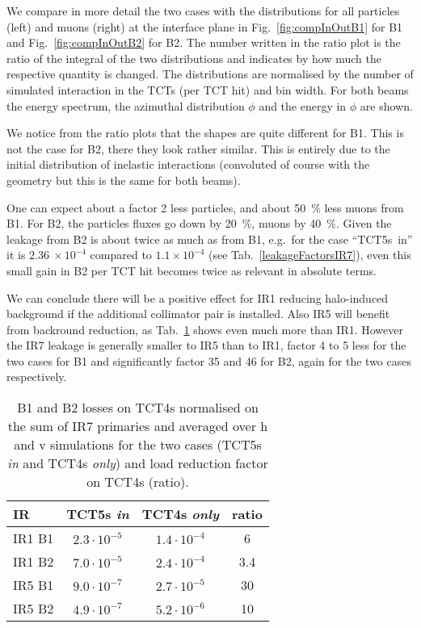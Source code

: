 We compare in more detail the two cases with the distributions for all particles (left) and muons (right) at the interface plane in Fig.~\ref{fig:compInOutB1} for B1 and Fig.~\ref{fig:compInOutB2} for B2. The number written in the ratio plot is the ratio of the integral of the two distributions and indicates by how much the respective quantity is changed. The distributions are normalised by the number of simulated interaction in the TCTs (per TCT hit) and bin width. For both beams the energy spectrum, the azimuthal distribution $\phi$ and the energy in $\phi$ are shown.

We notice from the ratio plots that the shapes are quite different for B1. This is not the case for B2, there they look rather similar. This is entirely due to the initial distribution of inelastic interactions (convoluted of course with the geometry but this is the same for both beams).

One can expect about a factor 2 less particles, and about 50~\% less muons from B1. For B2, the particles fluxes go down by 20~\%, muons by 40~\%. Given the leakage from B2 is about twice as much as from B1, e.g.~for the case ``TCT5s~in'' it is $2.36~\times 10^{-4}$ compared to $1.1 \times 10^{-4}$ (see Tab.~\ref{leakageFactorsIR7}), even this small gain in B2 per TCT hit becomes twice as relevant in absolute terms. 

We can conclude there will be a positive effect for IR1 reducing halo-induced background if the additional collimator pair is installed. Also IR5 will benefit from backround reduction, as Tab.~\ref{tab:compLosses} shows even much more than IR1. However the IR7 leakage is generally smaller to IR5 than to IR1, factor 4 to 5 less for the two cases for B1 and significantly factor 35 and 46 for B2, again for the two cases respectively.


\begin{table}%
   \centering
   \caption{B1 and B2 losses on TCT4s  normalised on the sum of IR7 primaries and averaged over h and v simulations for the two cases (TCT5s \textit{in} and TCT4s \textit{only}) and load reduction factor on TCT4s (ratio).}
   \begin{tabular}{l|c|c|c}
       \hline
       IR & TCT5s \textit{in} &  TCT4s \textit{only} & ratio \\
       \hline\hline
       IR1 B1 & $2.3 \cdot 10^{-5}$ & $1.4 \cdot 10^{-4}$ & 6\\
       IR1 B2 & $7.0 \cdot 10^{-5}$ & $2.4 \cdot 10^{-4}$ & 3.4 \\ 
       IR5 B1 & $9.0 \cdot 10^{-7}$ & $2.7 \cdot 10^{-5}$ & 30\\
       IR5 B2 & $4.9 \cdot 10^{-7}$ & $5.2 \cdot 10^{-6}$ & 10\\

       \hline
   \end{tabular}
   \label{tab:compLosses}
\end{table}




